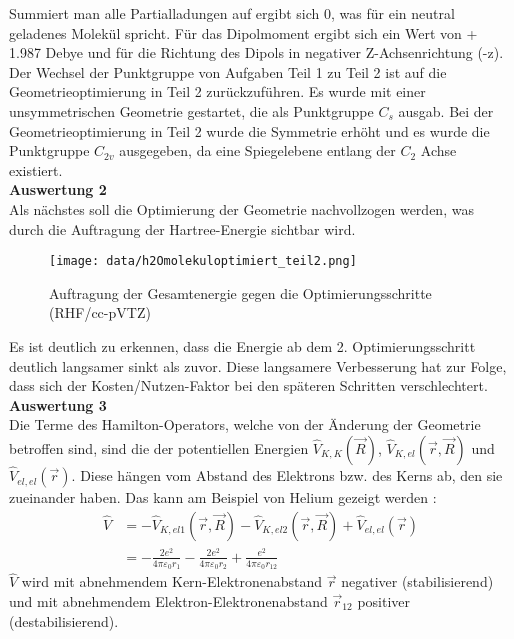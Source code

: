 \documentclass[12pt]{article}
\begin{document}
\begin{onehalfspace}
\begin{table}[htbp]
\begin{tabular}{lr}
\end{tabular}
\end{table}
\noindent
Summiert man alle Partialladungen auf ergibt sich 0, was für ein neutral geladenes Molekül spricht.
Für das Dipolmoment ergibt sich ein Wert von + 1.987 Debye und für die Richtung des Dipols in negativer Z-Achsenrichtung (-z).
Der Wechsel der Punktgruppe von Aufgaben Teil 1 zu Teil 2 ist auf die Geometrieoptimierung in Teil 2 zurückzuführen. Es wurde mit einer unsymmetrischen Geometrie gestartet, die als Punktgruppe $C _s$ ausgab. Bei der Geometrieoptimierung in Teil 2 wurde die Symmetrie erhöht und es wurde die Punktgruppe $C _{2v}$ ausgegeben, da eine Spiegelebene entlang der $C _2$ Achse existiert.\\
\noindent
\textbf{Auswertung 2}\\
Als nächstes soll die Optimierung der Geometrie nachvollzogen werden, was durch die Auftragung der Hartree-Energie sichtbar wird.
\begin{figure}[!htp]
\centering
  \texttt{[image: data/h2Omolekuloptimiert\_teil2.png]}%
  \caption{Auftragung der Gesamtenergie gegen die Optimierungsschritte (RHF/cc-pVTZ)}
\end{figure}
Es ist deutlich zu erkennen, dass die Energie ab dem 2. Optimierungsschritt deutlich langsamer sinkt als zuvor. Diese langsamere Verbesserung hat zur Folge, dass sich der Kosten/Nutzen-Faktor bei den späteren Schritten verschlechtert.\\
\newpage
\noindent
\textbf{Auswertung 3}\\
Die Terme des Hamilton-Operators, welche von der Änderung der Geometrie betroffen sind, sind die der potentiellen Energien
$\hat{V} _{K,K}(\vec{R})$, $\hat{V} _{K,el}(\vec{r},\vec{R})$ und $\hat{V} _{el,el}(\vec{r})$.
Diese hängen vom Abstand des Elektrons bzw. des Kerns ab, den sie zueinander haben. Das kann am Beispiel von Helium gezeigt werden \cite{atkins219}:\\
\begin{align*}
\hat{V} &= - \hat{V} _{K,el1}(\vec{r},\vec{R}) - \hat{V} _{K,el2}(\vec{r},\vec{R})  + \hat{V} _{el,el}(\vec{r}) \\
  &= - \frac{2e^2}{4\pi \varepsilon _0 r _1} - \frac{2e^2}{4\pi \varepsilon _0 r _2} +  \frac{e^2}{4\pi \varepsilon _0 r _{12}}
\end{align*}
$\hat{V}$ wird mit abnehmendem Kern-Elektronenabstand $\vec{r}$ negativer (stabilisierend) und mit abnehmendem Elektron-Elektronenabstand $\vec{r} _{12}$ positiver (destabilisierend).


\end{onehalfspace}
\end{document}
